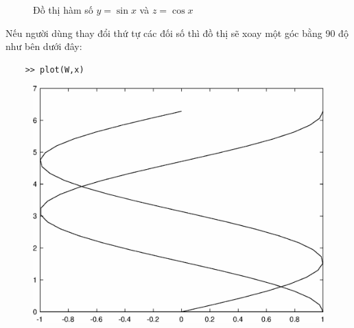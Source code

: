 \documentclass[12pt,a4paper]{article}
\begin{document}
\begin{example}
\begin{center}
\begin{figure}[htp]
\begin{center}
	\end{center}
		\caption{Đồ thị hàm số $y=\sin{x}$ và $z=\cos{x}$}
		\label{refdothi3}
	\end{figure}
\end{center}
Nếu người dùng thay đổi thứ tự các đối số thì đồ thị sẽ xoay một góc bằng 90 độ như bên dưới đây:
\begin{lstlisting}
	>> plot(W,x)
\end{lstlisting}
\begin{center}
	\begin{figure}[htp]
	\begin{center}
		\includegraphics[scale=0.6]{hinhtieuluan/dothi4}
	\end{center}
		\caption{}
		\label{refdothi4}
	\end{figure}
\end{center}
\end{example}
\end{document}

